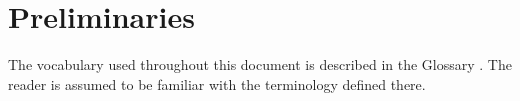 \section{Preliminaries}
\label{sec:model}

The vocabulary used throughout this document is described in the Glossary \cite{glossary}.
The reader is assumed to be familiar with the terminology defined there.





